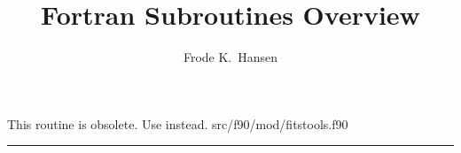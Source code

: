
\sloppy


\title{\healpix Fortran Subroutines Overview}
 \section[write\_dbintab]{ }
\label{sub:write_dbintab}
\author{Frode K.~Hansen}

\begin{facility}
{This routine is obsolete. Use  instead.}
{src/f90/mod/fitstools.f90}
\end{facility}


\rule{\hsize}{2mm}

\newpage
